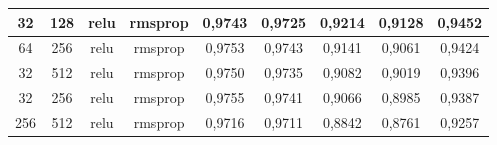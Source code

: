 \begin{table}[H]
{\begin{tabular}{|c|c|c|c|c|c|c|c|c|}
				32                                                                    & 128                                                            & relu                & rmsprop                & 0,9743                                                                 & 0,9725                                                              & 0,9214                                                                            & 0,9128                                                                         & 0,9452                                                               \\ \hline
				64                                                                    & 256                                                            & relu                & rmsprop                & 0,9753                                                                 & 0,9743                                                              & 0,9141                                                                            & 0,9061                                                                         & 0,9424                                                               \\ \hline
				32                                                                    & 512                                                            & relu                & rmsprop                & 0,9750                                                                 & 0,9735                                                              & 0,9082                                                                            & 0,9019                                                                         & 0,9396                                                               \\ \hline
				32                                                                    & 256                                                            & relu                & rmsprop                & 0,9755                                                                 & 0,9741                                                              & 0,9066                                                                            & 0,8985                                                                         & 0,9387                                                               \\ \hline
				256                                                                   & 512                                                            & relu                & rmsprop                & 0,9716                                                                 & 0,9711                                                              & 0,8842                                                                            & 0,8761                                                                         & 0,9257                                                               \\ \hline

\end{tabular}}
\end{table}
